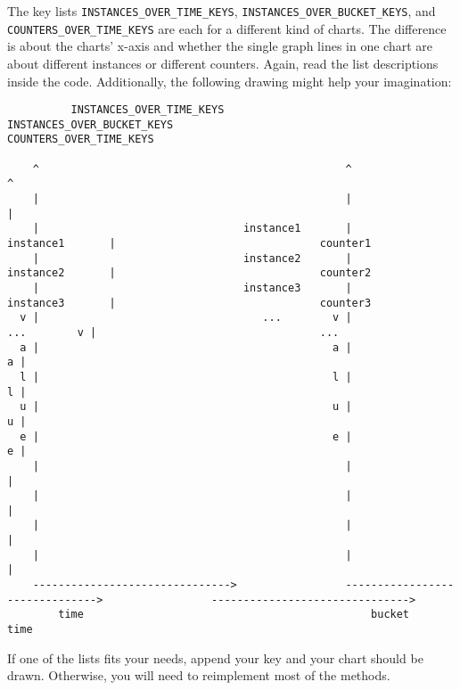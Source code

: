 \documentclass[a4paper,11pt]{article}
\begin{document}
The key lists \verb|INSTANCES_OVER_TIME_KEYS|, \verb|INSTANCES_OVER_BUCKET_KEYS|, and \verb|COUNTERS_|\break\verb|OVER_TIME_KEYS| are each for a different kind of charts. The difference is about the charts' x-axis and whether the single graph lines in one chart are about different instances or different counters. Again, read the list descriptions inside the code. Additionally, the following drawing might help your imagination:

\begin{lstlisting}
          INSTANCES_OVER_TIME_KEYS                         INSTANCES_OVER_BUCKET_KEYS                        COUNTERS_OVER_TIME_KEYS

    ^                                                ^                                                ^                                                         
    |                                                |                                                |                                                         
    |                                instance1       |                                instance1       |                                counter1                
    |                                instance2       |                                instance2       |                                counter2                
    |                                instance3       |                                instance3       |                                counter3                
  v |                                   ...        v |                                   ...        v |                                   ...                   
  a |                                              a |                                              a |                                                         
  l |                                              l |                                              l |                                                         
  u |                                              u |                                              u |                                                         
  e |                                              e |                                              e |                                                         
    |                                                |                                                |                                                         
    |                                                |                                                |                                                         
    |                                                |                                                |                                                         
    |                                                |                                                |                                                         
    ------------------------------->                 ------------------------------->                 ------------------------------->                          
        time                                             bucket                                           time                                                  
\end{lstlisting}
If one of the lists fits your needs, append your key and your chart should be drawn. Otherwise, you will need to reimplement most of the methods. 
\end{document}
